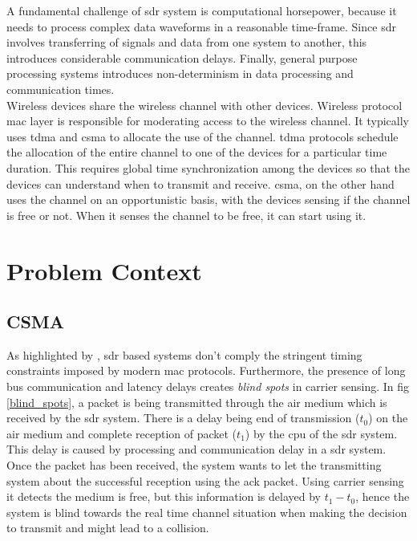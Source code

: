 A fundamental challenge of \ac{sdr} system is computational horsepower, because it needs to process complex data waveforms in a reasonable time-frame. Since \ac{sdr} involves transferring of signals and data from one system to another, this introduces considerable communication delays. Finally, general purpose processing systems introduces non-determinism in data processing and communication times.\\

Wireless devices share the wireless channel with other devices. Wireless protocol \ac{mac} layer is responsible for moderating access to the wireless channel. It typically uses \ac{tdma} and \ac{csma} to allocate the use of the channel. \ac{tdma} protocols schedule the allocation of the entire channel to one of the devices for a particular time duration. This requires global time synchronization among the devices so that the devices can understand when to transmit and receive. \ac{csma}, on the other hand uses the channel on an opportunistic basis, with the devices sensing if the channel is free or not. When it senses the channel to be free, it can start using it.  


\section{Problem Context}

\subsection{CSMA}
As highlighted by \cite{schmid_experimental_2007}, \ac{sdr} based systems don't comply the stringent timing constraints imposed by modern \ac{mac} protocols. Furthermore, the presence of long bus communication and latency delays creates \textit{blind spots}\cite{schmid_experimental_2007} in carrier sensing. In fig \ref{blind_spots}, a packet is being transmitted through the air medium which is received by the \ac{sdr} system. There is a delay being end of transmission ($t_0$) on the air medium and complete reception of packet ($t_1$) by the \ac{cpu} of the \ac{sdr} system. This delay is caused by processing and communication delay in a \ac{sdr} system. Once the packet has been received, the system wants to let the transmitting system about the successful reception using the \ac{ack} packet. Using carrier sensing it detects the medium is free, but this information is delayed by $t_1 - t_0$, hence the system is blind towards the real time channel situation when making the decision to transmit and might lead to a collision. \\ 

